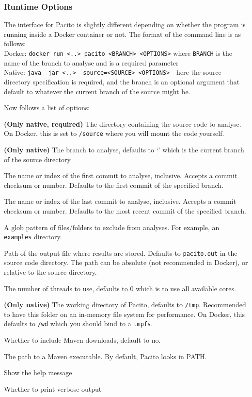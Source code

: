 \subsubsection{Runtime Options}
The interface for Pacito is slightly different depending on whether the program is running inside a Docker container or not. The format of the command line is as follows:\\
Docker: {\tt docker run <..> pacito <BRANCH> <OPTIONS>} where {\tt BRANCH} is the name of the branch to analyse and is a required parameter\\
Native: {\tt java -jar <..> --source=<SOURCE> <OPTIONS>} - here the source directory specification is required, and the branch is an optional argument that default to whatever the current branch of the source might be.

Now follows a list of options:
\begin{description}[font=\tt]
\item[-s, --source] {\bf (Only native, required)} The directory containing the source code to analyse. On Docker, this is set to {\tt /source} where you will mount the code yourself.
\item[-b, --branch] {\bf (Only native)} The branch to analyse, defaults to `{\tt\@}' which is the current branch of the source directory
\item[--start] The name or index of the first commit to analyse, inclusive. Accepts a commit checksum or number. Defaults to the first commit of the specified branch.
\item[--end] The name or index of the last commit to analyse, inclusive. Accepts a commit checksum or number. Defaults to the most recent commit of the specified branch.
\item[--exclude] A glob pattern of files/folders to exclude from analyses. For example, an {\tt examples} directory.
\item[-o, --output] Path of the output file where results are stored. Defaults to {\tt pacito.out} in the source code directory. The path can be absolute (not recommended in Docker), or relative to the source directory.
\item[-n, --threads] The number of threads to use, defaults to 0 which is to use all available cores.
\item[-wd, --working-dir] {\bf (Only native)} The working directory of Pacito, defaults to {\tt /tmp}. Recommended to have this folder on an in-memory file system for performance. On Docker, this defaults to {\tt /wd} which you should bind to a {\tt tmpfs}.
\item[--do-mvn, --no-do-mvn] Whether to include Maven downloads, default to no.
\item[--mvn] The path to a Maven executable. By default, Pacito looks in PATH.
\item[-h, --help] Show the help message
\item[-v] Whether to print verbose output
\end{description}

